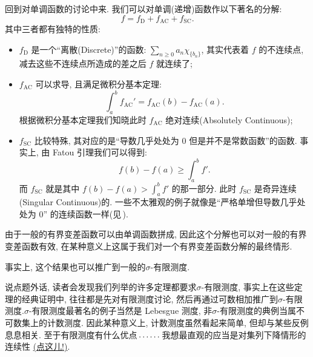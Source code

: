 \begin{alterendnote}
    回到对单调函数的讨论中来. 我们可以对单调(递增)函数作以下著名的分解:
    \[f = f_{\mathrm D} + f_{\mathrm{AC}} + f_{\mathrm{SC}}.\]
    其中三者都有独特的性质:
    \begin{itemize}
        \item $f_{\mathrm D}$ 是一个``离散(Discrete)''的函数: $\sum_{n\geqslant 0}a_n\chi_{\{b_n\}}$, 其实代表着 $f$ 的不连续点, 减去这些不连续点所造成的差之后 $f$ 就连续了;
        \item $f_{\mathrm{AC}}$ 可以求导, 且满足微积分基本定理: \[\int_a^b f_{\mathrm{AC}}' = f_{\mathrm{AC}}(b)-f_{\mathrm{AC}}(a).\] 根据微积分基本定理我们知晓此时 $f_{\mathrm{AC}}$ 绝对连续(Absolutely Continuous);
        \item $f_{\mathrm{SC}}$ 比较特殊, 其对应的是``导数几乎处处为 $0$ 但是并不是常数函数''的函数. 事实上, 由 Fatou 引理我们可以得到: \[f(b) - f(a) \geqslant \int_{a}^b f'.\] 而 $f_{\mathrm{SC}}$ 就是其中 $f(b) - f(a) > \int_{a}^b f'$ 的那一部分. 此时 $f_{\mathrm{SC}}$ 是奇异连续(Singular Continuous)的. 一些不太雅观的例子就像是``严格单增但导数几乎处处为 $0$'' 的连续函数一样(见\,\cite{Brown69}).
    \end{itemize}
    由于一般的有界变差函数可以由单调函数拼成, 因此这个分解也可以对一般的有界变差函数有效, 在某种意义上这属于我们对一个有界变差函数分解的最终情形.
\end{alterendnote}
\begin{alterendnote}
    \label{Fubini}事实上, 这个结果也可以推广到一般的\;$\sigma $-有限测度. \par 说点题外话, 读者会发现我们列举的许多定理都要求\;$\sigma $-有限测度, 事实上在这些定理的经典证明中, 往往都是先对有限测度讨论, 然后再通过可数相加推广到\;$\sigma $-有限测度.\;$\sigma $-有限测度最著名的例子当然是 Lebesgue 测度, 非\;$\sigma $-有限测度的典例当属不可数集上的计数测度. 因此某种意义上, 计数测度虽然看起来简单, 但却与某些反例息息相关. 至于有限测度有什么优点\,$\mathinner{\ldotp \ldotp \ldotp\ldotp \ldotp \ldotp}$\,我想最直观的应当是对集列下降情形的连续性 \hyperref[测度的连续性:集列下降]{(点这儿!)}.
\end{alterendnote}
